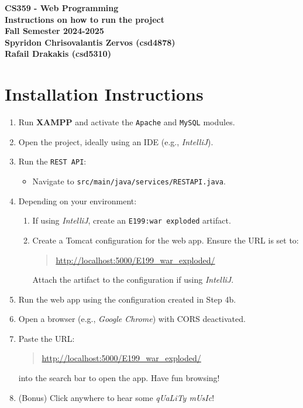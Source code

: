 \documentclass[12pt]{article}
\begin{document}
\begin{center}
    \textbf{\Large CS359 - Web Programming}\\[0.5cm]
    \textbf{\Large Instructions on how to run the project}\\[0.5cm]
    \textbf{\large Fall Semester 2024-2025}\\[1cm]
    \textbf{Spyridon Chrisovalantis Zervos (csd4878)}\\[0.2cm]
    \textbf{Rafail Drakakis (csd5310)}
\end{center}
\section*{Installation Instructions}

\begin{enumerate}[label=\arabic*.]
    \item Run \textbf{XAMPP} and activate the \texttt{Apache} and \texttt{MySQL} modules.
    \item Open the project, ideally using an IDE (e.g., \textit{IntelliJ}).
    \item Run the \texttt{REST API}:
    \begin{itemize}
        \item Navigate to \texttt{src/main/java/services/RESTAPI.java}.
    \end{itemize}
    \item Depending on your environment:
    \begin{enumerate}[label=\alph*.]
        \item If using \textit{IntelliJ}, create an \texttt{E199:war exploded} artifact.
        \item Create a Tomcat configuration for the web app. Ensure the URL is set to:
        \begin{quote}
            \url{http://localhost:5000/E199_war_exploded/}
        \end{quote}
        Attach the artifact to the configuration if using \textit{IntelliJ}.
    \end{enumerate}
    \item Run the web app using the configuration created in Step 4b.
    \item Open a browser (e.g., \textit{Google Chrome}) with CORS deactivated.
    \item Paste the URL:
    \begin{quote}
        \url{http://localhost:5000/E199_war_exploded/}
    \end{quote}
    into the search bar to open the app. Have fun browsing!
    \item (Bonus) Click anywhere to hear some \textit{qUaLiTy mUsIc}!
\end{enumerate}
\end{document}

